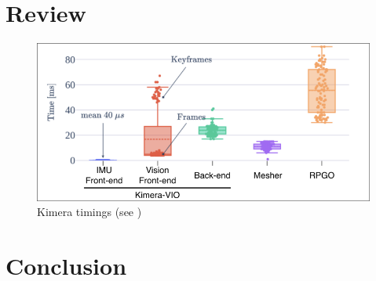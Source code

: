 \documentclass[11pt,a4paper]{article}
\begin{document}
\section{Review}
\begin{figure}
  \centering
  \includegraphics[width=120mm]{Timings}
  \caption{Kimera timings (see \cite{rosinol2020kimera})}\label{Fig:Timings}  
\end{figure}

\section{Conclusion}


{\small                   %

}
\end{document}
